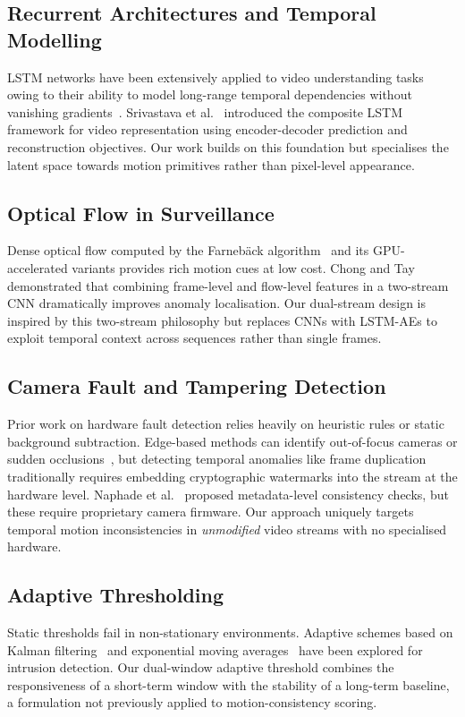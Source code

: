 \documentclass[runningheads]{llncs}
\begin{document}
\subsection{Recurrent Architectures and Temporal Modelling}
LSTM networks have been extensively applied to video understanding tasks
owing to their ability to model long-range temporal dependencies without
vanishing gradients~\cite{ref_lstm}. Srivastava et al.~\cite{ref_composite}
introduced the composite LSTM framework for video representation using
encoder-decoder prediction and reconstruction objectives. Our work builds
on this foundation but specialises the latent space towards motion
primitives rather than pixel-level appearance.

\subsection{Optical Flow in Surveillance}
Dense optical flow computed by the Farneb\"{a}ck algorithm~\cite{ref_farneback}
and its GPU-accelerated variants provides rich motion cues at low cost.
Chong and Tay~\cite{ref_chong} demonstrated that combining frame-level
and flow-level features in a two-stream CNN dramatically improves anomaly
localisation. Our dual-stream design is inspired by this two-stream
philosophy but replaces CNNs with LSTM-AEs to exploit temporal context
across sequences rather than single frames.

\subsection{Camera Fault and Tampering Detection}
Prior work on hardware fault detection relies heavily on heuristic rules
or static background subtraction. Edge-based methods can identify
out-of-focus cameras or sudden occlusions~\cite{ref_tamper}, but detecting
temporal anomalies like frame duplication traditionally requires embedding
cryptographic watermarks into the stream at the hardware level. Naphade
et al.~\cite{ref_naphade} proposed metadata-level consistency checks, but
these require proprietary camera firmware. Our approach uniquely targets
temporal motion inconsistencies in \textit{unmodified} video streams with
no specialised hardware.

\subsection{Adaptive Thresholding}
Static thresholds fail in non-stationary environments. Adaptive schemes
based on Kalman filtering~\cite{ref_kalman} and exponential moving
averages~\cite{ref_ema} have been explored for intrusion detection. Our
dual-window adaptive threshold combines the responsiveness of a short-term
window with the stability of a long-term baseline, a formulation not
previously applied to motion-consistency scoring.
\end{document}
